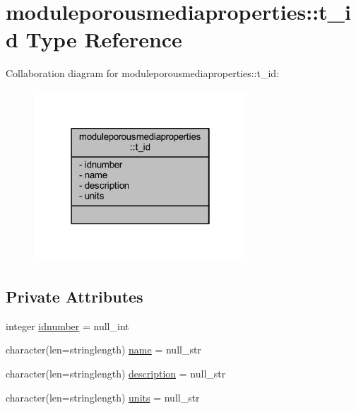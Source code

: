 \hypertarget{structmoduleporousmediaproperties_1_1t__id}{}\section{moduleporousmediaproperties\+:\+:t\+\_\+id Type Reference}
\label{structmoduleporousmediaproperties_1_1t__id}


Collaboration diagram for moduleporousmediaproperties\+:\+:t\+\_\+id\+:\nopagebreak
\begin{figure}[H]
\begin{center}
\leavevmode
\includegraphics[width=226pt]{structmoduleporousmediaproperties_1_1t__id__coll__graph}
\end{center}
\end{figure}
\subsection*{Private Attributes}
\begin{DoxyCompactItemize}
\item 
integer \mbox{\hyperlink{structmoduleporousmediaproperties_1_1t__id_adb587a98d3e64edf587afb83eca225e2}{idnumber}} = null\+\_\+int
\item 
character(len=stringlength) \mbox{\hyperlink{structmoduleporousmediaproperties_1_1t__id_ad08670b4742a7b975c9464dbb753ed01}{name}} = null\+\_\+str
\item 
character(len=stringlength) \mbox{\hyperlink{structmoduleporousmediaproperties_1_1t__id_a0f680a0f1d8d0f0dfb4c3d12c6e7dd77}{description}} = null\+\_\+str
\item 
character(len=stringlength) \mbox{\hyperlink{structmoduleporousmediaproperties_1_1t__id_ad6e7f6a6a0fb30727fe956fa92dd29e3}{units}} = null\+\_\+str
\end{DoxyCompactItemize}


